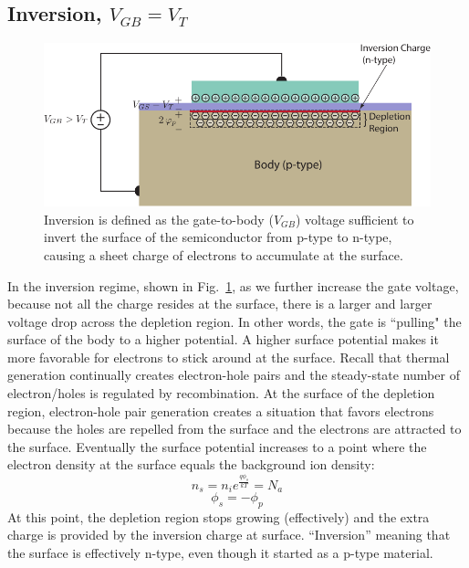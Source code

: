 \subsection{Inversion, $V_{GB} = V_T$}
\begin{figure}[tbh]
\begin{center}
\includegraphics[width=.75\columnwidth]{mos_cap_inversion}
\end{center}
\caption{Inversion is defined as the gate-to-body ($V_{GB}$) voltage sufficient to invert the surface of the semiconductor from p-type to n-type, causing a sheet charge of electrons to accumulate at the surface.}
\label{fig:mos_inv}
\end{figure}

In the inversion regime, shown in Fig.~\ref{fig:mos_inv}, as we further increase the gate voltage, because not all the charge resides at the surface, there is a larger and larger voltage drop across the depletion region.  In other words, the gate is ``pulling" the surface of the body to a higher potential.  A higher surface potential makes it more favorable for electrons to stick around at the surface.  Recall that thermal generation continually creates electron-hole pairs and the steady-state number of electron/holes is regulated by recombination.  At the surface of the depletion region, electron-hole pair generation creates a situation that favors electrons because the holes are repelled from the surface and the electrons are attracted to the surface.  Eventually the surface potential increases to a point where the electron density at the surface equals the background ion density:
\begin{equation}
{n_s} = {n_i}{e^{\frac{{q{\phi _s}}}{{kT}}}} = {N_a}
\end{equation}
\begin{equation}
{\phi _s} =  - {\phi _p}
\end{equation}
At this point, the depletion region stops growing (effectively) and the extra charge is provided by the inversion charge at surface.   “Inversion” meaning that the surface is effectively n-type, even though it started as a p-type material.  
